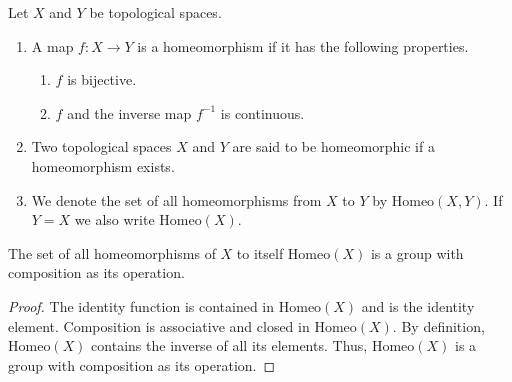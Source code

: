 \begin{defbox}
    \begin{definition}[Homeomorphism]
        Let \(X\) and \(Y\) be {\color{mathif}topological spaces}.
        \begin{enumerate}
            \item A {\color{mathobj}map} \(f: X \longrightarrow Y\) is a {\color{maththen}homeomorphism} if it has the following properties.

            \begin{enumerate}
                \item \(f\) is {\color{mathif}bijective}.
                \item \(f\) and the {\color{mathif}inverse map} \(f^{-1}\) is {\color{mathif}continuous}.
            \end{enumerate}

            \item Two topological spaces \(X\) and \(Y\) are said to be {\color{maththen}homeomorphic} if a homeomorphism exists.

            \item We denote the set of all homeomorphisms from \(X\) to \(Y\) by \(\mathrm{Homeo}(X, Y)\). If \(Y = X\) we also write \(\mathrm{Homeo}(X)\).
        \end{enumerate}
    \end{definition}
\end{defbox}

%
\begin{thmbox}
    \begin{proposition}
        The set of all homeomorphisms of \(X\) to itself \(\mathrm{Homeo}(X)\) is a group with composition as its operation.
    \end{proposition}
\end{thmbox}

\begin{proof}
    The identity function is contained in \(\mathrm{Homeo}(X)\) and is the identity element. Composition is associative and closed in \(\mathrm{Homeo}(X)\). By definition, \(\mathrm{Homeo}(X)\) contains the inverse of all its elements. Thus, \(\mathrm{Homeo}(X)\) is a group with composition as its operation.
\end{proof}

